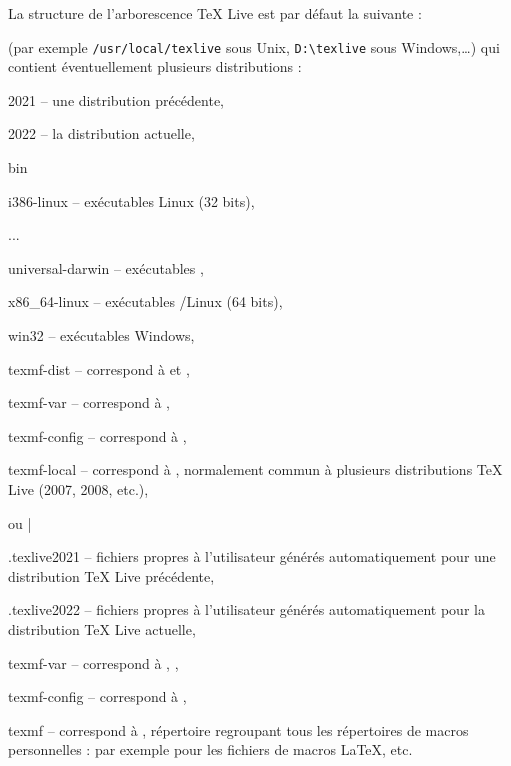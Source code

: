 \documentclass[german, english, french]{article}
\renewcommand{\TL}{\TeX{} Live\xspace}%
\begin{document}
La structure de l'arborescence \TL{} est par défaut la suivante :
\begin{description}
\item[racine multi-utilisateur] (par exemple \verb|/usr/local/texlive| sous
  Unix, \verb|D:\texlive| sous Windows,\dots) qui contient éventuellement
  plusieurs distributions :
  \begin{ttdescription}
  \item[2021] -- une distribution précédente,
  \item[2022] -- la distribution actuelle,
    \begin{ttdescription}
    \item[bin] ~
      \begin{ttdescription}
      \item[i386-linux] -- exécutables Linux (32 bits),
      \item[...]
      \item [universal-darwin] -- exécutables \MacOSX,
      \item [x86\_64-linux] -- exécutables \GNU/Linux (64 bits),
      \item[win32] -- exécutables Windows,
      \end{ttdescription}
    \item[texmf-dist] -- correspond à  et
      ,
    \item[texmf-var] -- correspond à ,
    \item[texmf-config] -- correspond à ,
    \end{ttdescription}
  \item[texmf-local] -- correspond à , normalement commun
    à plusieurs distributions \TL{} (2007, 2008, etc.),
  \end{ttdescription}
\item[répertoire personnel de l'utilisateur]  %
  ou |%
  \begin{ttdescription}
  \item[.texlive2021] -- fichiers propres à l'utilisateur générés
    automatiquement pour une distribution \TL{} précédente,
  \item[.texlive2022] -- fichiers propres à l'utilisateur générés
    automatiquement pour la distribution \TL{} actuelle,
    \begin{ttdescription}
    \item[texmf-var] -- correspond à , ,
    \item[texmf-config] -- correspond à ,
    \end{ttdescription}
  \item[texmf] -- correspond à , répertoire regroupant tous
    les répertoires de macros personnelles :  par
    exemple pour les fichiers de macros \LaTeX, etc.
  \end{ttdescription}
\end{description}
\end{document}
